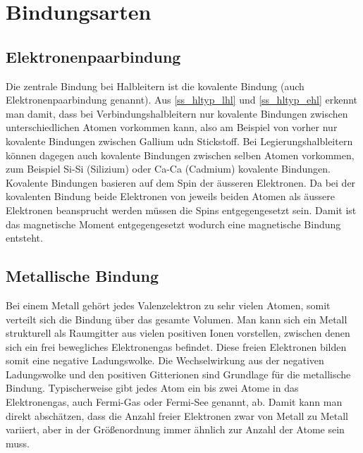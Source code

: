 \section{Bindungsarten}
	\subsection{Elektronenpaarbindung}
	Die zentrale Bindung bei Halbleitern ist die kovalente Bindung (auch Elektronenpaarbindung genannt). Aus \ref{ss_hltyp_lhl} und \ref{ss_hltyp_ehl} erkennt man damit, dass bei Verbindungshalbleitern nur kovalente Bindungen zwischen unterschiedlichen Atomen vorkommen kann, also am Beispiel von vorher nur kovalente Bindungen zwischen Gallium udn Stickstoff. Bei Legierungshalbleitern können dagegen auch kovalente Bindungen zwischen selben Atomen vorkommen, zum Beispiel Si-Si (Silizium) oder Ca-Ca (Cadmium) kovalente Bindungen.
	Kovalente Bindungen basieren auf dem Spin der äusseren Elektronen. Da bei der kovalenten Bindung beide Elektronen von jeweils beiden Atomen als äussere Elektronen beansprucht werden müssen die Spins entgegengesetzt sein. Damit ist das magnetische Moment entgegengesetzt wodurch eine magnetische Bindung entsteht. 
	\subsection{Metallische Bindung}
	Bei einem Metall gehört jedes Valenzelektron zu sehr vielen Atomen, somit verteilt sich die Bindung über das gesamte Volumen. Man kann sich ein Metall strukturell als Raumgitter aus vielen positiven Ionen vorstellen, zwischen denen sich ein frei bewegliches Elektronengas befindet. Diese freien Elektronen bilden somit eine negative Ladungswolke. Die Wechselwirkung aus der negativen Ladungswolke und den positiven Gitterionen sind Grundlage für die metallische Bindung. Typischerweise gibt jedes Atom ein bis zwei Atome in das Elektronengas, auch Fermi-Gas oder Fermi-See genannt, ab. Damit kann man direkt abschätzen, dass die Anzahl freier Elektronen zwar von Metall zu Metall variiert, aber in der Größenordnung immer ähnlich zur Anzahl der Atome sein muss.
